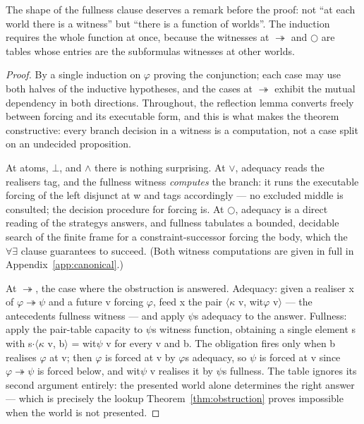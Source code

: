 The shape of the fullness clause deserves a remark before the proof:
not ``at each world there is a witness'' but ``there is a function of
worlds''. The induction requires the whole function at once, because the
witnesses at \ensuremath{\twoheadrightarrow} and \ensuremath{\bigcirc} are tables whose entries are the subformula\textquotesingle s
witnesses at other worlds.

\begin{proof}
By a single induction on \ensuremath{\varphi} proving the conjunction; each
case may use both halves of the inductive hypotheses, and the cases at
\ensuremath{\twoheadrightarrow} exhibit the mutual dependency in both directions. Throughout, the
reflection lemma converts freely between forcing and its executable
form, and this is what makes the theorem constructive: every
branch decision in a witness is a computation, not a case split on an
undecided proposition.

At atoms, \ensuremath{\bot}, and \ensuremath{\wedge} there is nothing surprising. At \ensuremath{\vee},
adequacy reads the realiser\textquotesingle s tag, and the fullness witness
\emph{computes} the branch: it runs the executable forcing of the left
disjunct at w and tags accordingly --- no excluded middle is consulted;
the decision procedure for forcing is. At \ensuremath{\bigcirc}, adequacy is a direct
reading of the strategy\textquotesingle s answers, and fullness tabulates a bounded,
decidable search of the finite frame for a constraint-successor forcing
the body, which the \ensuremath{\forall\exists} clause guarantees to succeed. (Both
witness computations are given in full in
Appendix~\ref{app:canonical}.)

At \ensuremath{\twoheadrightarrow}, the case where the obstruction is answered. Adequacy: given a
realiser x of \ensuremath{\varphi \twoheadrightarrow \psi} and a future v forcing \ensuremath{\varphi},
feed x the pair \ensuremath{\langle\kappa} v, wit\ensuremath{\varphi} v\ensuremath{\rangle} --- the antecedent\textquotesingle s fullness witness --- and
apply \ensuremath{\psi}\textquotesingle s adequacy to the answer. Fullness: apply the pair-table
capacity to \ensuremath{\psi}\textquotesingle s witness function, obtaining a single element s with
s\ensuremath{\cdot\langle\kappa} v, b\ensuremath{\rangle} = wit\ensuremath{\psi} v for every v and b. The obligation fires only when b
realises \ensuremath{\varphi} at v; then \ensuremath{\varphi} is forced at v by \ensuremath{\varphi}\textquotesingle s adequacy, so \ensuremath{\psi} is forced
at v since \ensuremath{\varphi \twoheadrightarrow \psi} is forced below, and wit\ensuremath{\psi} v realises it by \ensuremath{\psi}\textquotesingle s
fullness. The table ignores its second argument entirely: the presented
world alone determines the right answer --- which is precisely the lookup
Theorem~\ref{thm:obstruction} proves impossible when the world is not
presented.
\end{proof}

